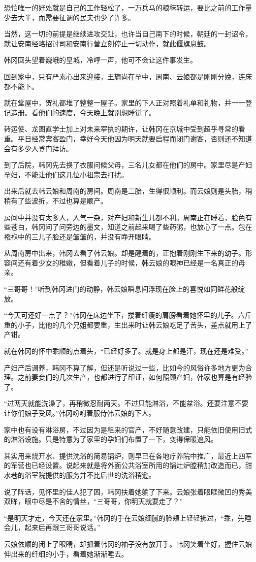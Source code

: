 恐怕唯一的好处就是自己的工作轻松了，一万兵马的粮秣转运，要比之前的工作量少去大半，而需要征调的民夫也少了许多。

当然，这一切的前提是继续进攻交趾，也许当自己南下的时候，朝廷的一封诏令，就让安南经略招讨司和安南行营立刻停止一切动作，就此偃旗息鼓。

韩冈回头望着巍峨的皇城，冷哼一声，他可不会让这件事发生。

回到家中，只有严素心出来迎接，王旖尚在孕中，周南、云娘都是刚刚分娩，连床都不能下。

就在堂屋中，贺礼都堆了整整一屋子。家里的下人正对照着礼单和礼物，并一一登记造册。看他们的速度，今天晚上就别想睡觉了。

转运使、龙图直学士加上对未来宰执的期许，让韩冈在京城中受到超乎寻常的看重。平日经常宾客盈门，幸好今天他因为明天就要启程而闭门谢客，否则还不知道会有多少人登门拜访。

到了后院，韩冈先去换了衣服问候父母，三名儿女都在他们的房中。家里尽是产妇孕妇，不能让他们这几位小祖宗去打扰。

出来后就去韩云娘和周南的房间。周南是二胎，生得很顺利。而云娘则是头胎，稍稍有了些波折，不过也算是顺产。

房间中并没有太多人，人气一杂，对产妇和新生儿都不利。周南正在睡着，脸色有些苍白，韩冈问了问旁边的墨文，知道之前起来喝了些药粥，也放心了一点。包在襁褓中的三儿子脸还是皱皱的，并没有睁开眼睛。

从周南房中出来，韩冈去看了韩云娘。却是醒着的，正抱着刚刚生下来的幼子。形容间还有着少女的稚嫩，但看着儿子的时候，韩云娘的眼神已经是一名真正的母亲。

“三哥哥！”听到韩冈进门的动静，韩云娘瞬息间浮现在脸上的喜悦如同鲜花般绽放。

“今天可还好一点了？”韩冈在床边坐下，搂着纤瘦的肩膀看着她怀里的儿子。六斤重的小子，比他的几个兄姐都要重，生出来时让韩云娘吃足了苦头，差点就用上了产钳。

就在韩冈的怀中乖顺的点着头，“已经好多了。就是身上都是汗，现在还是难受。”

产妇产后调养，韩冈不算了解，但还是听说过一些，比如今的风俗许多地方更为合理。之前妻妾们的几次生产，也都进行了印证，如何照顾产妇，韩家也算是有经验了。

“过两天就能洗澡了，再稍微忍耐两天。不过只能淋浴，不能盆浴。还要注意不要让你们娘子受风。”韩冈吩咐着服侍韩云娘的下人。

家中也有设有淋浴房，不过因为是租来的官产，不好随意改建，只能依旧使用旧式的淋浴设施。只是特意为了家里的孕妇们布置了一下，变得保暖遮风。

其实用来烧开水、提供洗浴的简易锅炉，则早已在各地疗养院中推广，最近上四军的军营也已经设置。说起来就是将外面公共浴室所用的锅灶炉膛稍加改造而已，甜水巷的浴室院提供的服务并不比后世的洗浴稍逊。

说了阵话，见怀里的佳人犯了困，韩冈扶着她躺了下来。云娘张着眼眶微凹的秀美双眸，眼中尽是不舍的情丝，“三哥哥，你明天就要走了？”

“是明天才走，今天还在家里。”韩冈的手在云娘细腻的脸颊上轻轻拂过，“乖，先睡会儿，起来后再跟三哥哥说话。”

云娘依顺的闭上了眼睛，却抓着韩冈的袖子没有放开手。韩冈笑着坐好，握住云娘伸出来的纤细的小手，看着她渐渐睡去。

